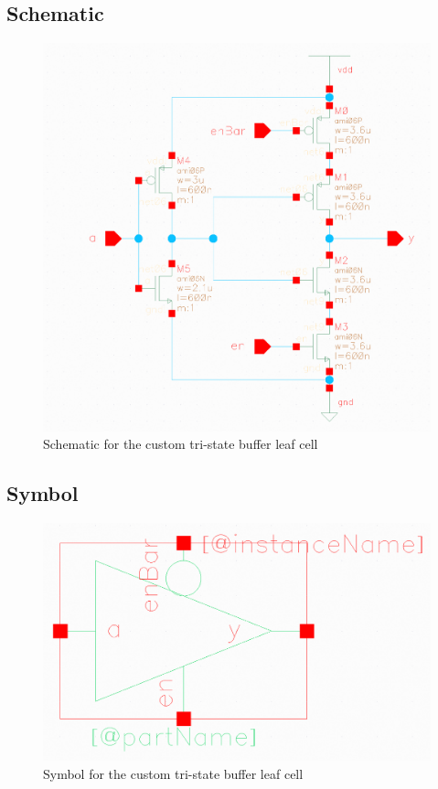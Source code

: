 \documentclass[12pt]{article}
\begin{document}
\begin{appendices}
    \subsection{Schematic}
    \begin{figure}[H]
        \begin{center}
        \includegraphics[width=16cm]{HMMMTristateSchematic.png}
        \caption{Schematic for the custom tri-state buffer leaf cell}
        \end{center}
    \end{figure}
    \subsection{Symbol}
    \begin{figure}[H]
        \begin{center}
        \includegraphics[width=16cm]{HMMMTristateSymbol.png}
        \caption{Symbol for the custom tri-state buffer leaf cell}
        \end{center}
    \end{figure}

\end{appendices}
\end{document}
